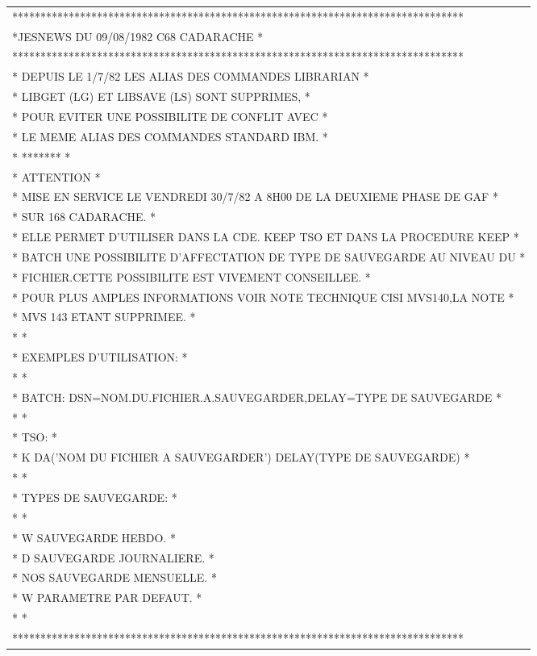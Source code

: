 {\scriptsize\ttfamily\begin{tabular}{l}
********************************************************************************\\
*JESNEWS DU 09/08/1982 C68 CADARACHE *\\
********************************************************************************\\
* DEPUIS LE 1/7/82 LES ALIAS DES COMMANDES LIBRARIAN *\\
* LIBGET (LG) ET LIBSAVE (LS) SONT SUPPRIMES, *\\
* POUR EVITER UNE POSSIBILITE DE CONFLIT AVEC *\\
* LE MEME ALIAS DES COMMANDES STANDARD IBM. *\\
* ******* *\\
* ATTENTION *\\
* MISE EN SERVICE LE VENDREDI 30/7/82 A 8H00 DE LA DEUXIEME PHASE DE GAF *\\
* SUR 168 CADARACHE. *\\
* ELLE PERMET D'UTILISER DANS LA CDE. KEEP TSO ET DANS LA PROCEDURE KEEP *\\
* BATCH UNE POSSIBILITE D'AFFECTATION DE TYPE DE SAUVEGARDE AU NIVEAU DU *\\
* FICHIER.CETTE POSSIBILITE EST VIVEMENT CONSEILLEE. *\\
* POUR PLUS AMPLES INFORMATIONS VOIR NOTE TECHNIQUE CISI MVS140,LA NOTE *\\
* MVS 143 ETANT SUPPRIMEE. *\\
* *\\
* EXEMPLES D'UTILISATION: *\\
* *\\
* BATCH: DSN=NOM.DU.FICHIER.A.SAUVEGARDER,DELAY=TYPE DE SAUVEGARDE *\\
* *\\
* TSO: *\\
* K DA('NOM DU FICHIER A SAUVEGARDER') DELAY(TYPE DE SAUVEGARDE) *\\
* *\\
* TYPES DE SAUVEGARDE: *\\
* *\\
* W SAUVEGARDE HEBDO. *\\
* D SAUVEGARDE JOURNALIERE. *\\
* NOS SAUVEGARDE MENSUELLE. *\\
* W PARAMETRE PAR DEFAUT. *\\
* *\\
********************************************************************************\\
\end{tabular}}
